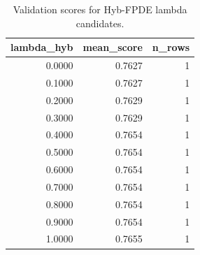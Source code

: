 \begin{table}[t]
\caption{Validation scores for Hyb-FPDE lambda candidates.}
\label{tab:lambda_distribution_computed}
\centering
\begin{tabular}{rrr}
\toprule
lambda\_hyb & mean\_score & n\_rows \\
\midrule
0.0000 & 0.7627 & 1 \\
0.1000 & 0.7627 & 1 \\
0.2000 & 0.7629 & 1 \\
0.3000 & 0.7629 & 1 \\
0.4000 & 0.7654 & 1 \\
0.5000 & 0.7654 & 1 \\
0.6000 & 0.7654 & 1 \\
0.7000 & 0.7654 & 1 \\
0.8000 & 0.7654 & 1 \\
0.9000 & 0.7654 & 1 \\
1.0000 & 0.7655 & 1 \\
\bottomrule
\end{tabular}

\end{table}
